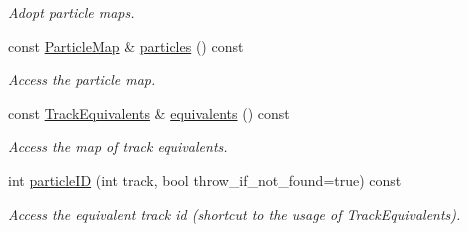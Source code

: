 \begin{DoxyCompactItemize}
\begin{DoxyCompactList}\small\item\em Adopt particle maps. \item\end{DoxyCompactList}\item 
const \hyperlink{class_d_d4hep_1_1_simulation_1_1_geant4_particle_map_a065c5fb0629285022b9aa2a628bffef3}{ParticleMap} \& \hyperlink{class_d_d4hep_1_1_simulation_1_1_geant4_particle_map_a3446a55a7dfdaf6d723c6a347249d63a}{particles} () const 
\begin{DoxyCompactList}\small\item\em Access the particle map. \item\end{DoxyCompactList}\item 
const \hyperlink{class_d_d4hep_1_1_simulation_1_1_geant4_particle_map_aba09f5fcb2dd5874d129660ad4454a21}{TrackEquivalents} \& \hyperlink{class_d_d4hep_1_1_simulation_1_1_geant4_particle_map_a82008879ab783a6e8d3cc683ba7fec5e}{equivalents} () const 
\begin{DoxyCompactList}\small\item\em Access the map of track equivalents. \item\end{DoxyCompactList}\item 
int \hyperlink{class_d_d4hep_1_1_simulation_1_1_geant4_particle_map_a9155a0ddccd1e18b880e335dcf75ab2d}{particleID} (int track, bool throw\_\-if\_\-not\_\-found=true) const 
\begin{DoxyCompactList}\small\item\em Access the equivalent track id (shortcut to the usage of TrackEquivalents). \item\end{DoxyCompactList}\end{DoxyCompactItemize}
